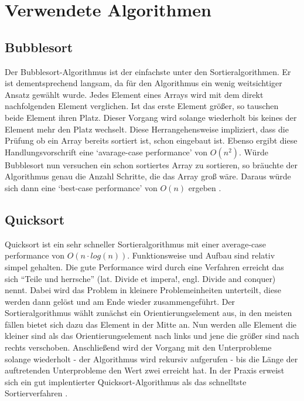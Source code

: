\section{Verwendete Algorithmen}
\subsection{Bubblesort}
 Der Bubblesort-Algorithmus ist der einfachste unter den Sortieralgorithmen. Er ist dementsprechend langsam,
 da für den Algorithmus ein wenig weitsichtiger Ansatz gewählt wurde. Jedes Element eines Arrays wird mit dem direkt nachfolgenden Element verglichen.
Ist das erste Element größer, 
 so tauschen beide Element ihren Platz. Dieser Vorgang wird solange wiederholt bis keines der Element mehr den Platz wechselt. 
 Diese Herrangehensweise impliziert, dass die Prüfung ob ein Array bereits sortiert ist, schon eingebaut ist. 
 Ebenso ergibt diese Handlungsvorschrift eine `avarage-case performance' von
 $O(n^2)$. Würde Bubblesort nun versuchen ein schon sortiertes Array zu sortieren, so bräuchte der Algorithmus genau die 
 Anzahl Schritte, die das Array groß wäre. Daraus würde sich dann eine `best-case performance' von $O(n)$ ergeben
 \parencite[vgl.][]{Bubblesort}.
 
\subsection{Quicksort}
Quicksort ist ein sehr schneller Sortieralgorithmus mit einer average-case performance von $O(n\cdot log(n))$. 
Funktionsweise und Aufbau sind relativ simpel gehalten. Die gute Performance wird durch eine Verfahren erreicht das 
sich "`Teile und herrsche"' (lat. Divide et impera!, engl. Divide and conquer)\cite{wiki_quicksort} nennt. Dabei wird das Problem
in kleinere Problemeinheiten unterteilt, diese werden dann gelöst und am Ende wieder zusammengeführt. Der Sortieralgorithmus wählt zunächst
ein Orientierungselement aus, in den meisten fällen bietet sich dazu das Element in der Mitte an. Nun werden alle Element die kleiner
sind als das Orientierungselement nach links und jene
die größer sind nach rechts verschoben. Anschließend wird der Vorgang mit den Unterprobleme solange wiederholt - der
Algorithmus wird rekursiv aufgerufen - bis die Länge der auftretenden Unterprobleme den Wert zwei erreicht hat. In der Praxis
erweist sich ein gut implentierter Quicksort-Algorithmus als das schnelltste Sortierverfahren \parencite[vgl.][]{quicksort}.

